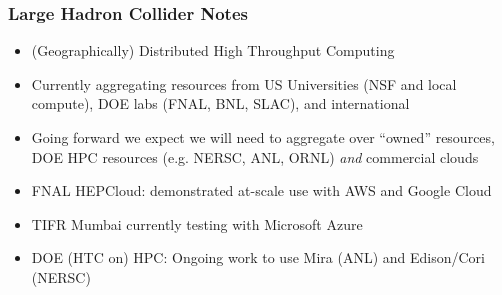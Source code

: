 \begin{frame}
\frametitle{Large Hadron Collider Notes}

\begin{itemize}
\item (Geographically) Distributed High Throughput Computing
\item Currently aggregating resources from US Universities (NSF and local
compute), DOE labs (FNAL, BNL, SLAC), and international 
\item Going forward we expect we will need to aggregate over ``owned'' resources, DOE HPC resources (e.g. NERSC, ANL, ORNL) {\it and} commercial clouds
\item FNAL HEPCloud: demonstrated at-scale use with AWS and Google Cloud 
\item TIFR Mumbai currently testing with Microsoft Azure
\item DOE (HTC on) HPC: Ongoing work to use Mira (ANL) and Edison/Cori (NERSC)
\end{itemize}

\end{frame}


